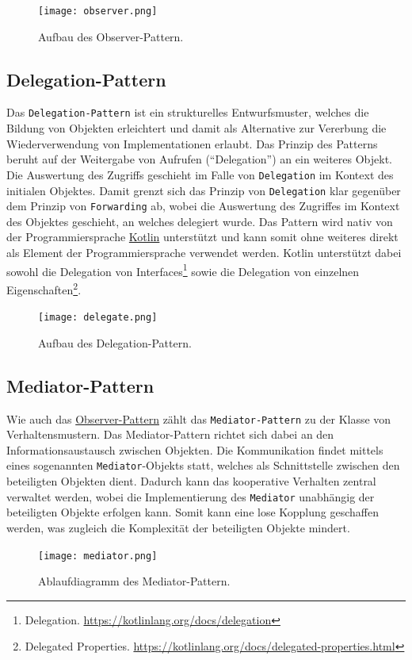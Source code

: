 \begin{figure}[H]
    \texttt{[image: observer.png]}
    \caption{Aufbau des Observer-Pattern.}\label{fig:observer}
\end{figure}

\subsection{Delegation-Pattern}\label{subsec:delegation}

Das \texttt{Delegation-Pattern} ist ein strukturelles Entwurfsmuster, welches die Bildung von Objekten erleichtert und damit als Alternative zur Vererbung die Wiederverwendung von Implementationen erlaubt. Das Prinzip des Patterns beruht auf der Weitergabe von Aufrufen (\enquote{Delegation}) an ein weiteres Objekt. Die Auswertung des Zugriffs geschieht im Falle von \texttt{Delegation} im Kontext des initialen Objektes. Damit grenzt sich das Prinzip von \texttt{Delegation} klar gegenüber dem Prinzip von \texttt{Forwarding} ab, wobei die Auswertung des Zugriffes im Kontext des Objektes geschieht, an welches delegiert wurde. Das Pattern wird nativ von der Programmiersprache \hyperref[sec:kotlin]{Kotlin} unterstützt und kann somit ohne weiteres direkt als Element der Programmiersprache verwendet werden. Kotlin unterstützt dabei sowohl die Delegation von Interfaces\footnote{Delegation. \url{https://kotlinlang.org/docs/delegation}} sowie die Delegation von einzelnen Eigenschaften\footnote{Delegated Properties. \url{https://kotlinlang.org/docs/delegated-properties.html}}.

\begin{figure}[H]
    \texttt{[image: delegate.png]}
    \caption{Aufbau des Delegation-Pattern.}\label{fig:delegation}
\end{figure}


\subsection{Mediator-Pattern}

Wie auch das \hyperref[sub:observer]{Observer-Pattern} zählt das \texttt{Mediator-Pattern} zu der Klasse von Verhaltensmustern. Das Mediator-Pattern richtet sich dabei an den Informationsaustausch zwischen Objekten. Die Kommunikation findet mittels eines sogenannten \texttt{Mediator}-Objekts statt, welches als Schnittstelle zwischen den beteiligten Objekten dient. Dadurch kann das kooperative Verhalten zentral verwaltet werden, wobei die Implementierung des \texttt{Mediator} unabhängig der beteiligten Objekte erfolgen kann. Somit kann eine lose Kopplung geschaffen werden, was zugleich die Komplexität der beteiligten Objekte mindert. 

\begin{figure}[H]
    \texttt{[image: mediator.png]}
    \caption{Ablaufdiagramm des Mediator-Pattern.}\label{fig:mediator}
\end{figure}
